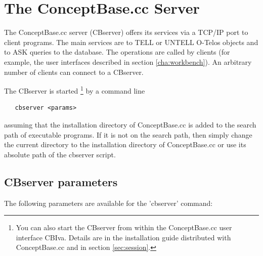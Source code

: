 
%

\chapter{The ConceptBase.cc Server}
\label{cha:cbserver}


The ConceptBase.cc server (CBserver) offers its services via a TCP/IP port to client
programs.
The main services are to TELL or UNTELL O-Telos objects
and to ASK queries to the database. The operations are called by clients
(for example, the user interfaces described in section \ref{cha:workbench}).
An arbitrary number of clients can connect to a CBserver.

The CBserver is started%
\footnote{You can also start the CBserver from within the ConceptBase.cc user interface CBIva. Details are in the 
installation guide distributed with ConceptBase.cc and in section \ref{sec:session}.}
 by a command line

\begin{verbatim}
   cbserver <params>
\end{verbatim}

assuming that the installation directory of ConceptBase.cc is
added to the search path of executable programs. If it is not on the
search path, then simply change the current directory to the installation
directory of ConceptBase.cc or use its absolute path of the cbserver script.


\section{CBserver parameters}
\label{sec:cbsparams}

The following parameters are available for the 'cbserver' command:

